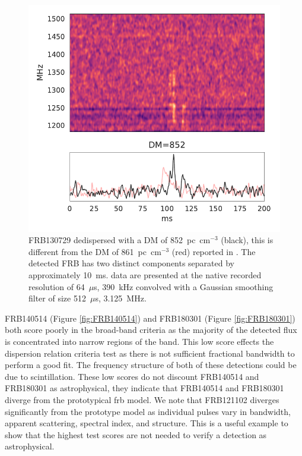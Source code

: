 \documentclass[a4paper,fleqn,usenatbib]{mnras}
\begin{document}
\begin{figure}
    \includegraphics[width=1.0\linewidth]{figures/FRB130729.pdf}
    \caption{FRB130729 dedispersed with a DM of 852~pc~cm$^{-3}$ (black), this
    is different from the DM of 861~pc~cm$^{-3}$ (red) reported in
    \protect\cite{2016MNRAS.460L..30C}.  The detected FRB has two distinct
    components separated by approximately 10~ms. data are presented at the native
    recorded resolution of 64~$\mu$s, 390~kHz convolved with a Gaussian
    smoothing filter of size 512~$\mu$s, 3.125~MHz.}
    \label{fig:FRB130729}
\end{figure}

FRB140514 (Figure \ref{fig:FRB140514}) and FRB180301 (Figure
\ref{fig:FRB180301}) both score poorly in the broad-band criteria as the
majority of the detected flux is concentrated into narrow regions of the band.
This low score effects the dispersion relation criteria test as there is not
sufficient fractional bandwidth to perform a good fit. The frequency structure
of both of these detections could be due to scintillation. These low scores do
not discount FRB140514 and FRB180301 as astrophysical, they indicate that
FRB140514 and FRB180301 diverge from the prototypical \gls{frb} model.  We note
that FRB121102 diverges significantly from the prototype model as individual
pulses vary in bandwidth, apparent scattering, spectral index, and structure.
This is a useful example to show that the highest test scores are not needed to
verify a detection as astrophysical.
\end{document}
